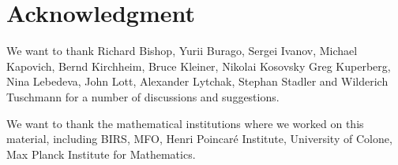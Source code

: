 \section*{Acknowledgment}
We want to thank 
Richard Bishop,
Yurii Burago,
Sergei Ivanov,
Michael Kapovich, 
Bernd Kirchheim, 
Bruce Kleiner,
Nikolai Kosovsky
Greg Kuperberg,
Nina Lebedeva,
John Lott,
Alexander Lytchak,
Stephan Stadler
and 
Wilderich Tuschmann
for a number of discussions and suggestions.



We want to thank the mathematical institutions where we worked on this material,  including
BIRS, 
MFO, 
Henri Poincar\'{e} Institute,
University of Colone, 
Max Planck Institute for Mathematics.










